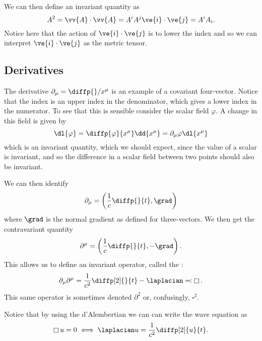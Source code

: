\documentclass[fleqn]{NotesClass}
\newcommand*{\dalembertian}{\mathop{\square}}
\begin{document}
    We can then define an invariant quantity as
    \begin{equation}
        A^2 = \vv{A} \cdot \vv{A} = A^iA^j\ve{i} \cdot \ve{j} = A^iA_i.
    \end{equation}
    Notice here that the action of \(\ve{i} \cdot \ve{j}\) is to lower the index and so we can interpret \(\ve{i} \cdot \ve{j}\) as the metric tensor.
    
    \subsection{Derivatives}
    The derivative \(\partial_\mu = \diffp{}/{x^\mu}\) is an example of a covariant four-vector.
    Notice that the index is an upper index in the denominator, which gives a lower index in the numerator.
    To see that this is sensible consider the scalar field \(\varphi\).
    A change in this field is given by
    \begin{equation}
        \dl{\varphi} = \diffp{\varphi}{x^\mu} \dd{x^\mu} = \partial_\mu \varphi \dl{x^\mu}
    \end{equation}
    which is an invariant quantity, which we should expect, since the value of a scalar is invariant, and so the difference in a scalar field between two points should also be invariant.
    
    We can then identify
    \begin{equation}
        \partial_\mu = \left( \frac{1}{c}\diffp{}{t}, \grad \right)
    \end{equation}
    where \(\grad\) is the normal gradient as defined for three-vectors.
    We then get the contravariant quantity
    \begin{equation}
        \partial^\mu = \left( \frac{1}{c}\diffp{}{t}, -\grad \right).
    \end{equation}
    This allows us to define an invariant operator, called the :
    \begin{equation}
        \partial_\mu\partial^\mu = \frac{1}{c^2}\diffp[2]{}{t} - \laplacian \eqqcolon \dalembertian.
    \end{equation}
    This same operator is sometimes denoted \(\partial^2\) or, confusingly, \(\square^2\).
    
    Notice that by using the d'Alembertian we can can write the wave equation as
    \begin{equation}
        \dalembertian u = 0 \iff \laplacian u = \frac{1}{c^2}\diffp[2]{u}{t}.
    \end{equation}
    
\end{document}
